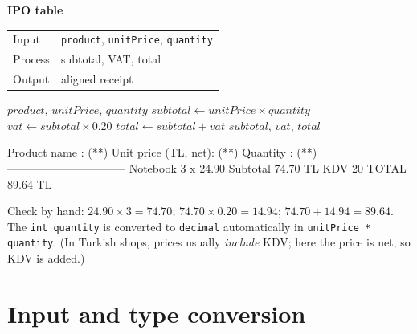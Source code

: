 \begin{center}
\begin{minipage}[c]{0.47\linewidth}
\textbf{IPO table}\\[1mm]\small
\begin{tabular}{@{}ll@{}}
Input & \texttt{product}, \texttt{unitPrice}, \texttt{quantity}\\
Process & subtotal, VAT, total\\
Output & aligned receipt
\end{tabular}
\end{minipage}\hfill
\begin{minipage}[c]{0.49\linewidth}
\begin{pseudobox}
\begin{algorithmic}[1]
\START
\State \READ $product$, $unitPrice$, $quantity$
\State $subtotal \gets unitPrice \times quantity$
\State $vat \gets subtotal \times 0.20$
\State $total \gets subtotal + vat$
\State \PRINT $subtotal$, $vat$, $total$
\STOP
\end{algorithmic}
\end{pseudobox}
\end{minipage}
\end{center}

\begin{consolebox}
\begin{run}
Product name        : (**)
Unit price (TL, net): (**)
Quantity            : (**)
--------------------------------
Notebook       3 x    24.90
Subtotal                74.70 TL
KDV 20%
TOTAL                   89.64 TL
\end{run}
\end{consolebox}
Check by hand: $24.90 \times 3 = 74.70$; $74.70 \times 0.20 = 14.94$; $74.70 + 14.94 = 89.64$. The \texttt{int quantity} is converted to \texttt{decimal} automatically in \texttt{unitPrice * quantity}. (In Turkish shops, prices usually \emph{include} KDV; here the price is net, so KDV is added.)

\section{Input and type conversion}\label{sec:input}

